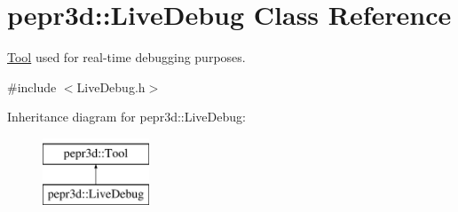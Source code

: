\hypertarget{classpepr3d_1_1_live_debug}{}\section{pepr3d\+::Live\+Debug Class Reference}
\label{classpepr3d_1_1_live_debug}


\mbox{\hyperlink{classpepr3d_1_1_tool}{Tool}} used for real-\/time debugging purposes.  




{\ttfamily \#include $<$Live\+Debug.\+h$>$}

Inheritance diagram for pepr3d\+::Live\+Debug\+:\begin{figure}[H]
\begin{center}
\leavevmode
\includegraphics[height=2.000000cm]{classpepr3d_1_1_live_debug}
\end{center}
\end{figure}
